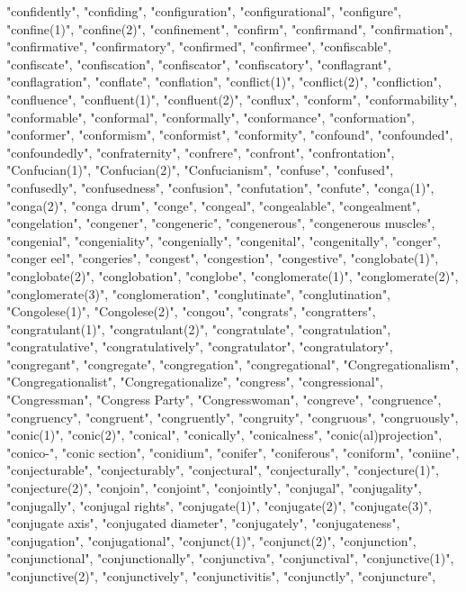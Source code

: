 "confidently",
"confiding",
"configuration",
"configurational",
"configure",
"confine(1)",
"confine(2)",
"confinement",
"confirm",
"confirmand",
"confirmation",
"confirmative",
"confirmatory",
"confirmed",
"confirmee",
"confiscable",
"confiscate",
"confiscation",
"confiscator",
"confiscatory",
"conflagrant",
"conflagration",
"conflate",
"conflation",
"conflict(1)",
"conflict(2)",
"confliction",
"confluence",
"confluent(1)",
"confluent(2)",
"conflux",
"conform",
"conformability",
"conformable",
"conformal",
"conformally",
"conformance",
"conformation",
"conformer",
"conformism",
"conformist",
"conformity",
"confound",
"confounded",
"confoundedly",
"confraternity",
"confrere",
"confront",
"confrontation",
"Confucian(1)",
"Confucian(2)",
"Confucianism",
"confuse",
"confused",
"confusedly",
"confusedness",
"confusion",
"confutation",
"confute",
"conga(1)",
"conga(2)",
"conga drum",
"conge",
"congeal",
"congealable",
"congealment",
"congelation",
"congener",
"congeneric",
"congenerous",
"congenerous muscles",
"congenial",
"congeniality",
"congenially",
"congenital",
"congenitally",
"conger",
"conger eel",
"congeries",
"congest",
"congestion",
"congestive",
"conglobate(1)",
"conglobate(2)",
"conglobation",
"conglobe",
"conglomerate(1)",
"conglomerate(2)",
"conglomerate(3)",
"conglomeration",
"conglutinate",
"conglutination",
"Congolese(1)",
"Congolese(2)",
"congou",
"congrats",
"congratters",
"congratulant(1)",
"congratulant(2)",
"congratulate",
"congratulation",
"congratulative",
"congratulatively",
"congratulator",
"congratulatory",
"congregant",
"congregate",
"congregation",
"congregational",
"Congregationalism",
"Congregationalist",
"Congregationalize",
"congress",
"congressional",
"Congressman",
"Congress Party",
"Congresswoman",
"congreve",
"congruence",
"congruency",
"congruent",
"congruently",
"congruity",
"congruous",
"congruously",
"conic(1)",
"conic(2)",
"conical",
"conically",
"conicalness",
"conic(al)projection",
"conico-",
"conic section",
"conidium",
"conifer",
"coniferous",
"coniform",
"coniine",
"conjecturable",
"conjecturably",
"conjectural",
"conjecturally",
"conjecture(1)",
"conjecture(2)",
"conjoin",
"conjoint",
"conjointly",
"conjugal",
"conjugality",
"conjugally",
"conjugal rights",
"conjugate(1)",
"conjugate(2)",
"conjugate(3)",
"conjugate axis",
"conjugated diameter",
"conjugately",
"conjugateness",
"conjugation",
"conjugational",
"conjunct(1)",
"conjunct(2)",
"conjunction",
"conjunctional",
"conjunctionally",
"conjunctiva",
"conjunctival",
"conjunctive(1)",
"conjunctive(2)",
"conjunctively",
"conjunctivitis",
"conjunctly",
"conjuncture",
